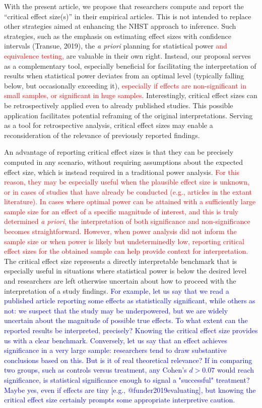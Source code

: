 \documentclass[
  man]{apa7}
\begin{document}
With the present article, we propose that researchers compute and report the ``critical effect size(s)'' in their empirical articles. This is not intended to replace other strategies aimed at enhancing the NHST approach to inference. Such strategies, such as the emphasis on estimating effect sizes with confidence intervals (Transue, 2019), the \textit{a priori} planning for statistical power \textcolor{red}{and equivalence testing,} are valuable in their own right. Instead, our proposal serves as a complementary tool, especially beneficial for facilitating the interpretation of results when statistical power deviates from an optimal level (typically falling below, but occasionally exceeding it), \textcolor{red}{especially if effects are non-significant in small samples, or significant in huge samples}. Interestingly, critical effect sizes can be retrospectively applied even to already published studies. This possible application facilitates potential reframing of the original interpretations. Serving as a tool for retrospective analysis, critical effect sizes may enable a reconsideration of the relevance of previously reported findings.

An advantage of reporting critical effect sizes is that they can be precisely computed in any scenario, without requiring assumptions about the expected effect size, which is instead required in a traditional power analysis. \textcolor{red}{For this reason, they may be especially useful when the plausible effect size is unknown, or in cases of studies that have already be conducted (e.g., articles in the extant literature). In cases where optimal power can be attained with a sufficiently large sample size for an effect of a specific magnitude of interest, and this is truly determined \textit{a priori}, the interpretation of both significance and non-significance becomes straightforward. However, when power analysis did not inform the sample size or when power is likely but undeterminedly low, reporting critical effect sizes for the obtained sample can help provide context for interpretation.} The critical effect size represents a directly interpretable benchmark that is especially useful in situations where statistical power is below the desired level and researchers are left otherwise uncertain about how to proceed with the interpretation of a study findings. \textcolor{blue}{For example, let us say that we read a published article reporting some effects as statistically significant, while others as not: we suspect that the study may be underpowered, but we are widely uncertain about the magnitude of possible true effects. To what extent can the reported results be interpreted, precisely? Knowing the critical effect size provides us with a clear benchmark. Conversely, let us say that an effect achieves significance in a very large sample: researchers tend to draw substantive conclusions based on this. But is it of real theoretical relevance? If in comparing two groups, such as controls versus treatment, any Cohen's $d > 0.07$ would reach significance, is statistical significance enough to signal a "successful" treatment? Maybe yes, even if effects are tiny [e.g., @funder2019evaluating], but knowing the critical effect size certainly prompts some appropriate interpretive caution.}
\end{document}
